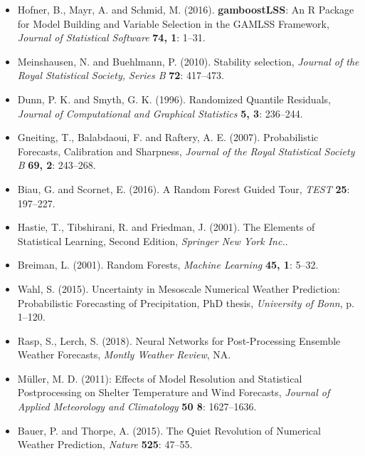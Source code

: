 \documentclass[american,foldmarks=false,noconfig]{uibklttr}
\begin{document}
\begin{itemize}[leftmargin=*]
\item[] Hofner, B., Mayr, A. and Schmid, M. (2016). 
\textbf{gamboostLSS}: An \textsf{R} Package for Model Building and 
Variable Selection in the {GAMLSS} Framework,
\textit{Journal of Statistical Software} \textbf{74, 1}: 1--31.


\item[] Meinshausen, N. and Buehlmann, P. (2010). 
Stability selection,
\textit{Journal of the Royal Statistical Society, Series B} 
\textbf{72}: 417--473.

\item[] Dunn, P. K. and Smyth, G. K. (1996).
Randomized Quantile Residuals,
\textit{Journal of Computational and Graphical Statistics}
\textbf{5, 3}: 236--244.

\item[] Gneiting, T., Balabdaoui, F. and Raftery, A. E. (2007).
Probabilistic Forecasts, Calibration and Sharpness,
\textit{Journal of the Royal Statistical Society B}
\textbf{69, 2}: 243--268.

\item[] Biau, G. and Scornet, E. (2016).
A Random Forest Guided Tour,
\textit{TEST}
\textbf{25}: 197--227.

\item[] Hastie, T., Tibshirani, R. and Friedman, J. (2001).
The Elements of Statistical Learning, Second Edition,
\textit{Springer New York Inc.}.

\item[] Breiman, L. (2001).
Random Forests,
\textit{Machine Learning}
\textbf{45, 1}: 5--32.

\item[] Wahl, S. (2015). Uncertainty in Mesoscale Numerical Weather Prediction:
Probabilistic Forecasting of Precipitation, PhD thesis, 
\textit{University of Bonn}, p. 1--120.%

\item[] Rasp, S., Lerch, S. (2018). Neural Networks for Post-Processing Ensemble
Weather Forecasts, \textit{Montly Weather Review}, NA.

\item[] M{\"u}ller, M. D. (2011): Effects of Model Resolution and Statistical
Postprocessing on Shelter Temperature and Wind Forecasts,
\textit{Journal of Applied Meteorology and Climatology} 
\textbf{50 8}: 1627--1636.

\item[] Bauer, P. and Thorpe, A. (2015). The Quiet Revolution of Numerical 
Weather Prediction,
\textit{Nature} \textbf{525}: 47--55.

\end{itemize}
\end{document}

